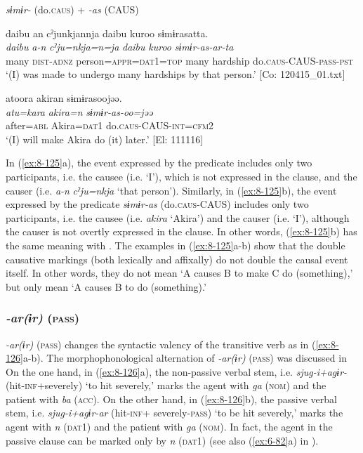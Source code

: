 \ea\label{ex:8-125}
  \textit{sɨmɨr-} (do.\textsc{caus}) + \textit{-as} (CAUS)

\ea
{\TM}
\glll  {\textbar}daibu{\textbar}  an  cˀjunkjannja  {\textbar}daibu  kuroo{\textbar}      sɨmɨrasatta.\\
\textit{daibu}  \textit{a-n}  \textit{cˀju=nkja=n=ja}  \textit{daibu}  \textit{kuroo}     \textit{sɨmɨr-as-ar-ta}\\
many  \textsc{dist}-\textsc{adnz}  person=\textsc{appr}=\textsc{dat1}=\textsc{top}  many  hardship  do.\textsc{caus}-CAUS-\textsc{pass}-\textsc{pst}\\
\glt ‘(I) was made to undergo many hardships by that person.’ [Co: 120415\_01.txt]

\ex
{\TM}
\glll  atoora  akiran  sɨmɨrasoojəə.\\
\textit{atu=kara}  \textit{akira=n}  \textit{sɨmɨr-as-oo=jəə}\\
after=\textsc{abl}  Akira=\textsc{dat1}  do.\textsc{caus}-CAUS-\textsc{int}=\textsc{cfm2}\\
\glt ‘(I) will make Akira do (it) later.’ [El: 111116]
\z
\z

In (\ref{ex:8-125}a), the event expressed by the predicate includes only two participants, i.e. the causee (i.e. ‘I’), which is not expressed in the clause, and the causer (i.e. \textit{a-n} \textit{cˀju=nkja} ‘that person’). Similarly, in (\ref{ex:8-125}b), the event expressed by the predicate \textit{sɨmɨr-as} (do.\textsc{caus}-CAUS) includes only two participants, i.e. the causee (i.e. \textit{akira} ‘Akira’) and the causer (i.e. ‘I’), although the causer is not overtly expressed in the clause. In other words, (\ref{ex:8-125}b) has the same meaning with . The examples in (\ref{ex:8-125}a-b) show that the double causative markings (both lexically and affixally) do not double the causal event itself. In other words, they do not mean ‘A causes B to make C do (something),’ but only mean ‘A causes B to do (something).’

\subsubsection{\textit{-ar(ɨr)} (\textsc{pass})}

\textit{-ar(ɨr)} (\textsc{pass}) changes the syntactic valency of the transitive verb as in (\ref{ex:8-126}a-b). The morphophonological alternation of \textit{-ar(ɨr)} (\textsc{pass}) was discussed in  On the one hand, in (\ref{ex:8-126}a), the non-passive verbal stem, i.e. \textit{sjug-i+agɨr-} (hit-\textsc{inf}+severely) ‘to hit severely,’ marks the agent with \textit{ga} (\textsc{nom}) and the patient with \textit{ba} (\textsc{acc}). On the other hand, in (\ref{ex:8-126}b), the passive verbal stem, i.e. \textit{sjug-i+agɨr-ar} (hit-\textsc{inf}+ severely-\textsc{pass}) ‘to be hit severely,’ marks the agent with \textit{n} (\textsc{dat1}) and the patient with \textit{ga} (\textsc{nom}). In fact, the agent in the passive clause can be marked only by \textit{n} (\textsc{dat1}) (see also (\ref{ex:6-82}a) in ).

